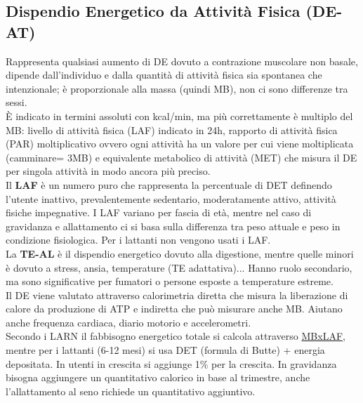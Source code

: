 \documentclass[10pt]{article}
\begin{document}
\subsection{Dispendio Energetico da Attività Fisica (DE-AT)}
Rappresenta qualsiasi aumento di DE dovuto a contrazione muscolare non basale, dipende dall'individuo e dalla quantità di attività fisica sia spontanea che intenzionale; è proporzionale alla massa (quindi MB), non ci sono differenze tra sessi.\\
È indicato in termini assoluti con kcal/min, ma più correttamente è multiplo del MB: livello di attività fisica (LAF) indicato in 24h, rapporto di attività fisica (PAR) moltiplicativo ovvero ogni attività ha un valore per cui viene moltiplicata (camminare= 3MB) e equivalente metabolico di attività (MET) che misura il DE per singola attività in modo ancora più preciso.\\ 
Il \textbf{LAF} è un numero puro che rappresenta la percentuale di DET definendo l'utente inattivo, prevalentemente sedentario, moderatamente attivo, attività fisiche impegnative. I LAF variano per fascia di età, mentre nel caso di gravidanza e allattamento ci si basa sulla differenza tra peso attuale e peso in condizione fisiologica. Per i lattanti non vengono usati i LAF.\\ 
La \textbf{TE-AL} è il dispendio energetico dovuto alla digestione, mentre quelle minori è dovuto a stress, ansia, temperature (TE adattativa)... Hanno ruolo secondario, ma sono significative per fumatori o persone esposte a temperature estreme.\\ 
Il DE viene valutato attraverso calorimetria diretta che misura la liberazione di calore da produzione di ATP e indiretta che può misurare anche MB. Aiutano anche frequenza cardiaca, diario motorio e accelerometri. \\
Secondo i LARN il fabbisogno energetico totale si calcola attraverso \underline{MBxLAF}, mentre per i lattanti (6-12 mesi) si usa DET (formula di Butte) + energia depositata. In utenti in crescita si aggiunge 1\% per la crescita. In gravidanza bisogna aggiungere un quantitativo calorico in base al trimestre, anche l'allattamento al seno richiede un quantitativo aggiuntivo. \\
\end{document}
